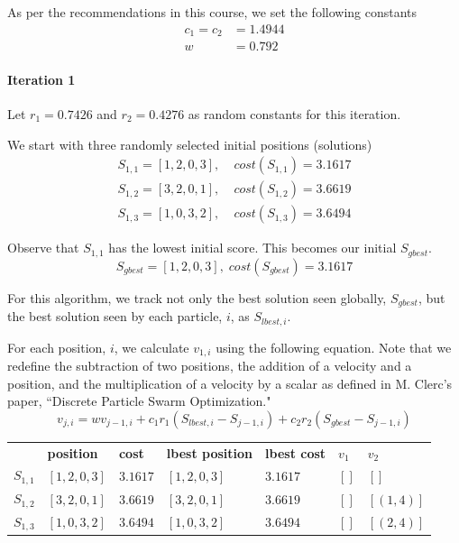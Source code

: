 \documentclass[a4paper]{article}
\newcommand{\subsubsubsection}[1]{\paragraph{#1} \mbox{}}
\begin{document}
As per the recommendations in this course, we set the following constants
\begin{align*}
c_1 = c_2 & = 1.4944 \\
w & = 0.792
\end{align*}

\subsubsubsection{Iteration 1}

Let $r_1 = 0.7426$ and $r_2 = 0.4276$ as random constants for this iteration.

We start with three randomly selected initial positions (solutions)
\begin{align*}
S_{1,1} = [1, 2, 0, 3], & \; cost(S_{1,1}) = 3.1617 \\
S_{1,2} = [3, 2, 0, 1], & \; cost(S_{1,2}) = 3.6619 \\
S_{1,3} = [1, 0, 3, 2], & \; cost(S_{1,3}) = 3.6494
\end{align*}

Observe that $S_{1,1}$ has the lowest initial score. This becomes our initial $S_\mathit{gbest}$.
$$S_\mathit{gbest} = [1, 2, 0, 3], \; cost(S_\mathit{gbest}) = 3.1617$$

For this algorithm, we track not only the best solution seen globally,
$S_\mathit{gbest}$, but the best solution seen by each particle, $i$, as
$S_{\mathit{lbest}, i}$.

For each position, $i$, we calculate
$v_{1,i}$ using the following equation. Note that we redefine the subtraction of
two positions, the addition of a velocity and a position, and the multiplication
of a velocity by a scalar as defined in M. Clerc's paper, ``Discrete Particle
Swarm Optimization."
$$
v_{j,i} =
  w v_{j-1, i} +
  c_1 r_1 (S_{\mathit{lbest}, i} - S_{j-1, i}) +
  c_2 r_2 (S_\mathit{gbest} - S_{j-1, i})
$$

\begin{center}
\begin{tabular}{lllllll}
          & \textbf{position} & \textbf{cost} & \textbf{lbest position} & \textbf{lbest cost} & $v_1$ & $v_2$            \\
$S_{1,1}$ & $[1, 2, 0, 3]$    & $3.1617$      & $[1, 2, 0, 3]$          & $3.1617$            & $[]$  & $[]      $ \\
$S_{1,2}$ & $[3, 2, 0, 1]$    & $3.6619$      & $[3, 2, 0, 1]$          & $3.6619$            & $[]$  & $[(1, 4)]$ \\
$S_{1,3}$ & $[1, 0, 3, 2]$    & $3.6494$      & $[1, 0, 3, 2]$          & $3.6494$            & $[]$  & $[(2, 4)]$ \\
\end{tabular}
\end{center}
\vspace{1.5em}
\end{document}
